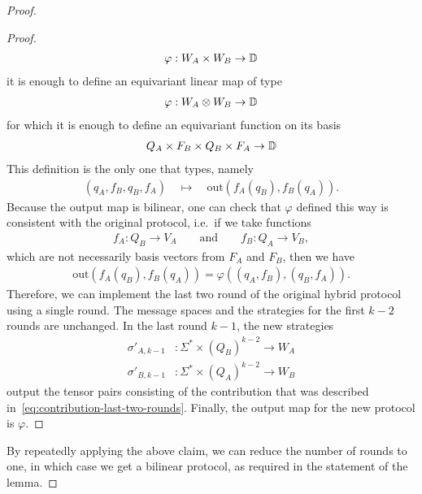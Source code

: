 \begin{proof}
\begin{proof}
        \begin{align*}
        \varphi : W_A \times W_B \to \mathbb D
        \end{align*}
        it is enough to define an equivariant linear map of type 
        \begin{align*}
        \varphi : W_A \otimes W_B \to \mathbb D
        \end{align*}
        for which it is enough to define an equivariant function on its basis
        \begin{align*}
        Q_A \times F_B \times Q_B \times F_A \to \mathbb D
        \end{align*}
        This definition is the only one that types, namely 
        \begin{align*}
        (q_A, f_B, q_B, f_A) \quad 
        \mapsto \quad 
        \text{out}(f_A(q_B), f_B(q_A)).
        \end{align*}
        Because the output map is bilinear, one can check that $\varphi$ defined this way is consistent with the original protocol, i.e.~if we take functions 
        \begin{align*}
        f_A : Q_B \to V_A \qquad \text{and} \qquad f_B : Q_A \to V_B,
        \end{align*}
        which are not necessarily basis vectors from $F_A$ and $F_B$, then we have 
        \begin{align*}
        \text{out}(f_A(q_B), f_B(q_A)) = \varphi((q_A, f_B), (q_B, f_A)).
        \end{align*}
        Therefore, we can implement the last two round of the original hybrid protocol using a single round. The message spaces and the strategies for the first $k-2$ rounds are unchanged. In the last round $k-1$, the new strategies
        \begin{align*}
        \sigma'_{A,k-1} & : \Sigma^* \times (Q_B)^{k-2} \to W_A\\
        \sigma'_{B,k-1} & : \Sigma^* \times (Q_A)^{k-2} \to W_B
        \end{align*}
        output the tensor pairs consisting of the contribution that was described in~\eqref{eq:contribution-last-two-rounds}. Finally, the output  map for the new protocol is $\varphi$. 
    \end{proof}

    By repeatedly applying the above claim, we can reduce the number of rounds to one, in which case we get a bilinear protocol, as required in the statement of the lemma. 
\end{proof}


